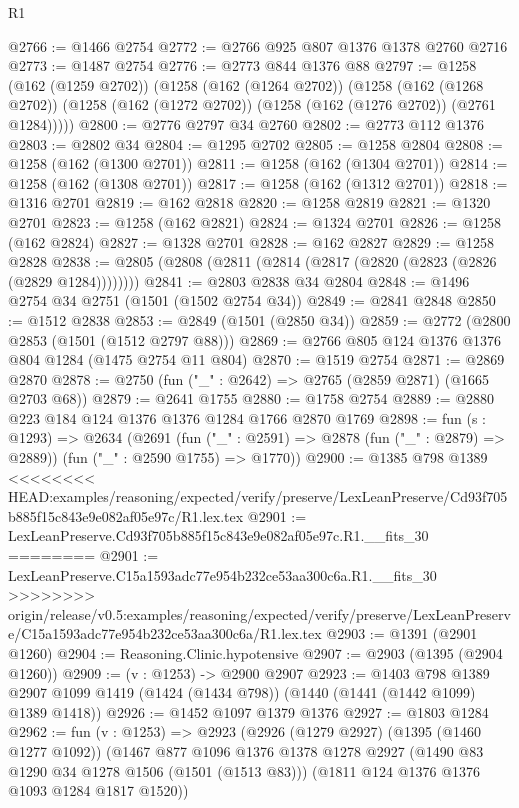 \begin{lexlean}{R1}
\begin{coremodule}
{{{{{{{{{{{{{{{{{{{{{{{{{{{{{{{{{{{{{{{{{{{{{{{{{{{{{{{{{{{{{{{{{{{{{{{{{{{{{{{{{{{{{{{{{{@2766 := @1466 @2754
@2772 := @2766 @925 @807 @1376 @1378 @2760 @2716
@2773 := @1487 @2754
@2776 := @2773 @844 @1376 @88
@2797 := @1258
    (@162 (@1259 @2702))
    (@1258
      (@162 (@1264 @2702))
      (@1258
        (@162 (@1268 @2702))
        (@1258 (@162 (@1272 @2702)) (@1258 (@162 (@1276 @2702)) (@2761 @1284)))))
@2800 := @2776 @2797 @34 @2760
@2802 := @2773 @112 @1376
@2803 := @2802 @34
@2804 := @1295 @2702
@2805 := @1258 @2804
@2808 := @1258 (@162 (@1300 @2701))
@2811 := @1258 (@162 (@1304 @2701))
@2814 := @1258 (@162 (@1308 @2701))
@2817 := @1258 (@162 (@1312 @2701))
@2818 := @1316 @2701
@2819 := @162 @2818
@2820 := @1258 @2819
@2821 := @1320 @2701
@2823 := @1258 (@162 @2821)
@2824 := @1324 @2701
@2826 := @1258 (@162 @2824)
@2827 := @1328 @2701
@2828 := @162 @2827
@2829 := @1258 @2828
@2838 := @2805 (@2808 (@2811 (@2814 (@2817 (@2820 (@2823 (@2826 (@2829 @1284))))))))
@2841 := @2803 @2838 @34 @2804
@2848 := @1496 @2754 @34 @2751 (@1501 (@1502 @2754 @34))
@2849 := @2841 @2848
@2850 := @1512 @2838
@2853 := @2849 (@1501 (@2850 @34))
@2859 := @2772 (@2800 @2853 (@1501 (@1512 @2797 @88)))
@2869 := @2766 @805 @124 @1376 @1376 @804 @1284 (@1475 @2754 @11 @804)
@2870 := @1519 @2754
@2871 := @2869 @2870
@2878 := @2750 (fun ("_" : @2642) => @2765 (@2859 @2871) (@1665 @2703 @68))
@2879 := @2641 @1755
@2880 := @1758 @2754
@2889 := @2880 @223 @184 @124 @1376 @1376 @1284 @1766 @2870 @1769
@2898 := fun (s : @1293) =>
  @2634
    (@2691
      (fun ("_" : @2591) => @2878 (fun ("_" : @2879) => @2889))
      (fun ("_" : @2590 @1755) => @1770))
@2900 := @1385 @798 @1389
<<<<<<<< HEAD:examples/reasoning/expected/verify/preserve/LexLeanPreserve/Cd93f705b885f15c843e9e082af05e97c/R1.lex.tex
@2901 := LexLeanPreserve.Cd93f705b885f15c843e9e082af05e97c.R1.__fits_30
========
@2901 := LexLeanPreserve.C15a1593adc77e954b232ce53aa300c6a.R1.__fits_30
>>>>>>>> origin/release/v0.5:examples/reasoning/expected/verify/preserve/LexLeanPreserve/C15a1593adc77e954b232ce53aa300c6a/R1.lex.tex
@2903 := @1391 (@2901 @1260)
@2904 := Reasoning.Clinic.hypotensive
@2907 := @2903 (@1395 (@2904 @1260))
@2909 := (v : @1253) -> @2900 @2907
@2923 := @1403
    @798
    @1389
    @2907
    @1099
    @1419
    (@1424 (@1434 @798))
    (@1440 (@1441 (@1442 @1099) @1389 @1418))
@2926 := @1452 @1097 @1379 @1376
@2927 := @1803 @1284
@2962 := fun (v : @1253) =>
  @2923
    (@2926
      (@1279 @2927)
      (@1395 (@1460 @1277 @1092))
      (@1467
        @877
        @1096
        @1376
        @1378
        @1278
        @2927
        (@1490 @83 @1290 @34 @1278 @1506 (@1501 (@1513 @83)))
        (@1811 @124 @1376 @1376 @1093 @1284 @1817 @1520))
}}}}}}}}}}}}}}}}}}}}}}}}}}}}}}}}}}}}}}}}}}}}}}}}}}}}}}}}}}}}}}}}}}}}}}}}}}}}}}}}}}}}}}}}}}
\end{coremodule}
\end{lexlean}
